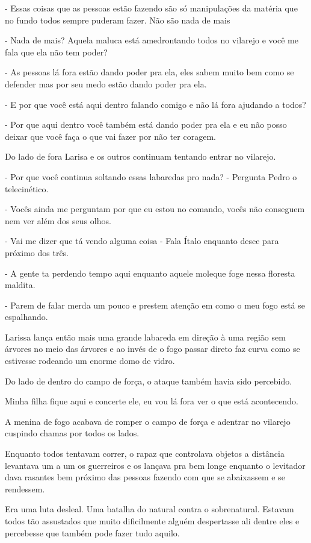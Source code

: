- Essas coisas que as pessoas estão fazendo são só manipulações da matéria que no fundo todos sempre puderam fazer. Não são nada de mais

- Nada de mais? Aquela maluca está amedrontando todos no vilarejo e você me fala que ela não tem poder?

- As pessoas lá fora estão dando poder pra ela, eles sabem muito bem como se defender mas por seu medo estão dando poder pra ela.

- E por que você está aqui dentro falando comigo e não lá fora ajudando a todos?

- Por que aqui dentro você também está dando poder pra ela e eu não posso deixar que você faça o que vai fazer por não ter coragem.


Do lado de fora Larisa e os outros continuam tentando entrar no vilarejo.

- Por que você continua soltando essas labaredas pro nada? - Pergunta Pedro o telecinético.

- Vocês ainda me perguntam por que eu estou no comando, vocês não conseguem nem ver além dos seus olhos.

- Vai me dizer que tá vendo alguma coisa - Fala Ítalo enquanto desce para próximo dos três.

- A gente ta perdendo tempo aqui enquanto aquele moleque foge nessa floresta maldita.

- Parem de falar merda um pouco e prestem atenção em como o meu fogo está se espalhando.

Larissa lança então mais uma grande labareda em direção à uma região sem árvores no meio das árvores e ao invés de o fogo passar direto faz curva como se estivesse rodeando um enorme domo de vidro.

Do lado de dentro do campo de força, o ataque também havia sido percebido.

Minha filha fique aqui e concerte ele, eu vou lá fora ver o que está acontecendo.

A menina de fogo acabava de romper o campo de força e adentrar no vilarejo cuspindo chamas por todos os lados.

Enquanto todos tentavam correr, o rapaz que controlava objetos a distância levantava um a um os guerreiros e os lançava pra bem longe enquanto o levitador dava rasantes bem próximo das pessoas fazendo com que se abaixassem e se rendessem.

Era uma luta desleal. Uma batalha do natural contra o sobrenatural. Estavam todos tão assustados que muito dificilmente alguém despertasse ali dentre eles e percebesse que também pode fazer tudo aquilo.

